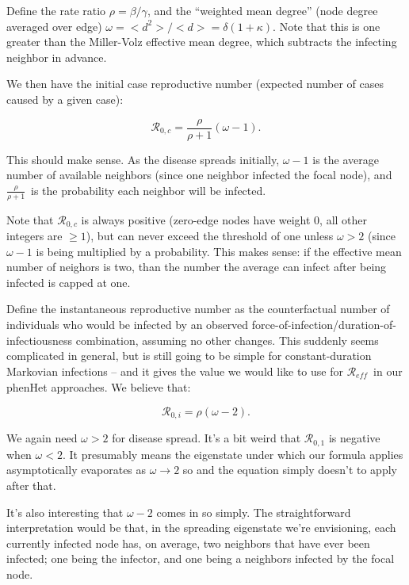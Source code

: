 \documentclass[12pt]{article}
\begin{document}
\newcommand{\Rx}[1]{\ensuremath{\mathcal{R}_{#1}}}
\newcommand{\emd}{\ensuremath{\omega}}
\newcommand{\iprob}{\ensuremath{\frac{\rho}{\rho+1}}}

Define the rate ratio $\rho = \beta/\gamma$, and the “weighted mean degree” (node degree averaged over edge) $\emd = <d^2>/<d> = \delta(1+
\kappa)$. Note that this is one greater than the Miller-Volz effective mean degree, which subtracts the infecting neighbor in advance.

We then have the initial case reproductive number (expected number of cases caused by a given case):

$$ \Rx{0,c} = \iprob(\emd-1). $$

This should make sense. As the disease spreads initially, $\emd - 1$ is the average number of available neighbors (since one neighbor infected the focal node), and \iprob\ is the probability each neighbor will be infected. 

Note that \Rx{0,c} is always positive (zero-edge nodes have weight 0, all other integers are $\geq1$), but can never exceed the threshold of one unless $\emd>2$ (since $\emd-1$ is being multiplied by a probability. This makes sense: if the effective mean number of neighors is two, than the number the average can infect after being infected is capped at one.

Define the instantaneous reproductive number as the counterfactual number of individuals who would be infected by an observed force-of-infection/duration-of-infectiousness combination, assuming no other changes. This suddenly seems complicated in general, but is still going to be simple for constant-duration Markovian infections -- and it gives the value we would like to use for \Rx{\mathit{eff}}\ in our phenHet approaches. We believe that:

$$ \Rx{0,i} = \rho(\emd-2).$$

We again need $\emd>2$ for disease spread. It's a bit weird that \Rx{0,1} is negative when $\emd<2$. It presumably means the eigenstate under which our formula applies asymptotically evaporates as $\emd\to2$ so and the equation simply doesn't to apply after that. 

It's also interesting that $\emd-2$ comes in so simply. The straightforward interpretation would be that, in the spreading eigenstate we're envisioning, each currently infected node has, on average, two neighbors that have ever been infected; one being the infector, and one being a neighbors infected by the focal node. 
\end{document}
